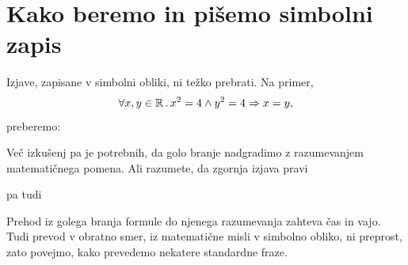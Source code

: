 




\section{Kako beremo in pišemo simbolni zapis}
\label{sec:simbolni-zapis}

Izjave, zapisane v simbolni obliki, ni težko prebrati. Na primer,
%
\begin{equation*}
  \forall x, y \in \mathbb{R} \,.\,
    x^2 = 4 \land y^2 = 4 \Rightarrow x = y,
\end{equation*}
%
preberemo:
%
\begin{quote}
\end{quote}
%
Več izkušenj pa je potrebnih, da golo branje nadgradimo z razumevanjem matematičnega pomena.
Ali razumete, da zgornja izjava pravi
%
\begin{quote}
\end{quote}
%
pa tudi
%
\begin{quote}
\end{quote}
%
Prehod iz golega branja formule do njenega razumevanja zahteva čas in vajo.
Tudi prevod v obratno smer, iz matematične misli v simbolno obliko, ni preprost,
zato povejmo, kako prevedemo nekatere standardne fraze.

